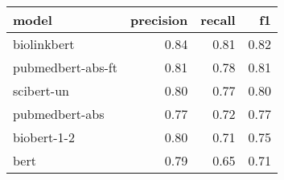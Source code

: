 \begin{tabular}{lrrr}
\toprule
model & precision & recall & f1 \\
\midrule
biolinkbert & 0.84 & 0.81 & 0.82 \\
pubmedbert-abs-ft & 0.81 & 0.78 & 0.81 \\
scibert-un & 0.80 & 0.77 & 0.80 \\
pubmedbert-abs & 0.77 & 0.72 & 0.77 \\
biobert-1-2 & 0.80 & 0.71 & 0.75 \\
bert & 0.79 & 0.65 & 0.71 \\
\bottomrule
\end{tabular}
